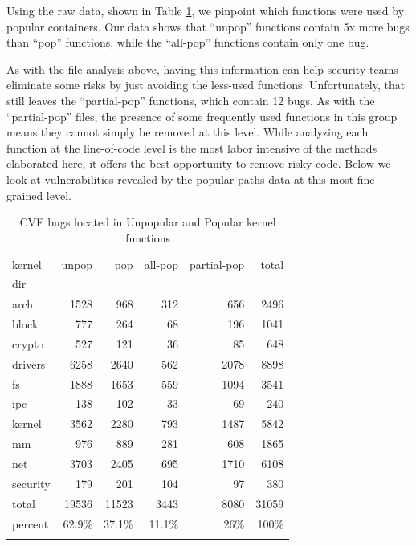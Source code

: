 Using the raw data, shown in Table \ref{tab:cve_functions}, we pinpoint which functions were used by popular containers. 
Our data shows that ``unpop'' functions contain 5x more bugs than ``pop'' functions, while the ``all-pop'' functions contain only one bug. 

As with the file analysis above, having this information can help security teams eliminate some risks by just avoiding the less-used functions. 
Unfortunately, that still leaves the ``partial-pop'' functions, which  contain 12 bugs.  As with the ``partial-pop'' files, 
the presence of some frequently used functions in this group means they cannot  simply be removed at this level. 
While analyzing each function at the line-of-code level is the most labor intensive of the methods elaborated here, it offers the best opportunity to remove risky code. 
Below we look at vulnerabilities revealed by the popular paths data at this most fine-grained level. 

\begin{table}
\small
\caption{CVE bugs located in Unpopular and Popular kernel functions}
\label{tab:cve_functions}
\begin{tabular}{l|r|r|r|r|r}
 kernel & unpop & pop & all-pop & partial-pop & total \\
 dir & \color{red}{(CVEs)} & \color{red}{(CVEs)} & \color{red}{(CVEs)} & \color{red}{(CVEs)} & \\
 \hline
 arch & 1528\color{red}{(7)} & 968\color{red}{(1)} & 312 & 656\color{red}{(1)} & 2496 \\
 \hline
 block & 777 & 264 & 68 & 196 & 1041 \\
 \hline
 crypto & 527\color{red}{(6)} & 121 & 36 & 85 & 648 \\
 \hline
 drivers & 6258\color{red}{(20)} & 2640 & 562 & 2078 & 8898 \\
 \hline
 fs & 1888\color{red}{(13)} & 1653\color{red}{(3)} & 559 & 1094\color{red}{(3)} & 3541 \\
 \hline
 ipc & 138 & 102 & 33 & 69 & 240 \\
 \hline
 kernel & 3562\color{red}{(8)} & 2280 & 793 & 1487 & 5842 \\
 \hline
 mm & 976\color{red}{(2)} & 889\color{red}{(6)} & 281 & 608\color{red}{(6)} & 1865 \\
 \hline
 net & 3703\color{red}{(9)} & 2405\color{red}{(3)} & 695\color{red}{(1)} & 1710\color{red}{(2)} & 6108 \\
 \hline
 security & 179 & 201 & 104 & 97 & 380 \\
 \hline
 total & 19536\color{red}{(65)} & 11523\color{red}{(13)} & 3443\color{red}{(1)} & 8080\color{red}{(12)} & 31059 \\
 \hline 
 percent & 62.9\% & 37.1\% & 11.1\% & 26\% & 100\% \\
 & \color{red}{(83.3\%)} & \color{red}{(16.7\%)} & \color{red}{(1.3\%)} & \color{red}{(15.4\%)} &
\end{tabular}
\end{table}

